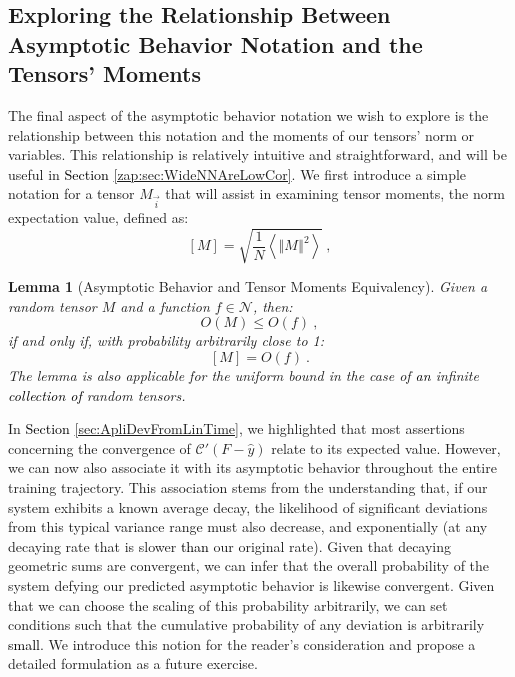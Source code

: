 \documentclass{article} %
\newtheorem{lemma}[theorem]{Lemma}
\begin{document}
\subsection{Exploring the Relationship Between Asymptotic Behavior Notation and the Tensors' Moments}
\label{zap:sec:AsympAndMoments}

The final aspect of the asymptotic behavior notation we wish to explore is the relationship between this notation and the moments of our tensors' norm or variables. This relationship is relatively intuitive and straightforward, and will be useful in \textcolor{black}{Section} \ref{zap:sec:WideNNAreLowCor}. We first introduce a simple notation for a tensor \(M_{\vec{i}}\) that will assist in examining tensor moments, the norm expectation value, defined as: 
\begin{equation}
\left[M\right]=\sqrt{\frac{1}{N}\left\langle \left\Vert M\right\Vert ^{2}\right\rangle } \ ,
\label{zap:eq:NormExpect}
\end{equation}

\begin{lemma}[Asymptotic Behavior and Tensor Moments Equivalency]
\label{Zap:lem:AsympAndMomentsEqu}
\textup{Given a random tensor \(M\) and a function \(f\in\mathcal{N}\), then:
\begin{equation}
O(M)\leq O(f) \ ,
\end{equation}
if and only if, with probability arbitrarily close to 1:
\begin{equation}
\left[M\right]=O\left(f\right) \ .
\end{equation}
The lemma is also applicable for the uniform bound in the case of \textcolor{black}{an} infinite \textcolor{black}{collection of} random tensors.}
\end{lemma}

In \textcolor{black}{Section} \ref{sec:ApliDevFromLinTime}, we highlighted that most assertions concerning the convergence of \(\mathcal{C}'(F-\hat{y})\) relate to its expected value. However, we can now also associate it with its asymptotic behavior throughout the entire training trajectory. This association stems from the understanding that, if our system exhibits a known average decay, the likelihood of significant deviations from this typical variance range must also decrease, and exponentially (at any decaying rate that is slower \textcolor{black}{than} our original rate). Given that decaying geometric sums are convergent, we can infer that the overall probability of the system defying our predicted asymptotic behavior is likewise convergent. Given that we can choose the scaling of this probability arbitrarily, we can set conditions such that the cumulative probability of any deviation is arbitrarily \textcolor{black}{small}. We introduce this notion for the reader's consideration and propose a detailed formulation as a future exercise.
\end{document}
